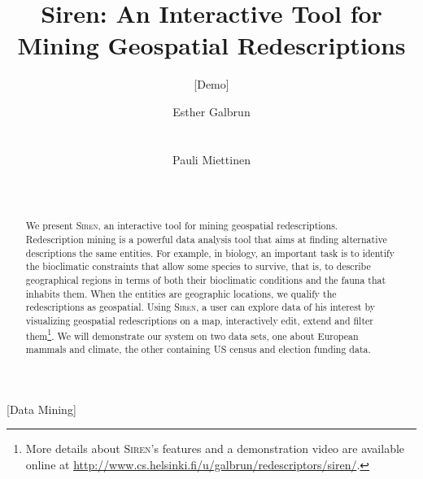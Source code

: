 \documentclass{sig-alternate}
\newcommand{\Siren}{\textsc{Siren}}
\begin{document}
\setlength{\pdfpageheight}{11in}%
\setlength{\pdfpagewidth}{8.5in}%


\title{Siren: An Interactive Tool for Mining Geospatial Redescriptions}
\subtitle{[Demo]}

\author{
\alignauthor
Esther Galbrun\\
       \\
       \\
\alignauthor
Pauli Miettinen\\
       \\
       \\
}

\maketitle
\begin{abstract}
  We present \Siren, an interactive tool for mining geospatial
  redescriptions.  Redescription mining is a powerful data analysis
  tool that aims at finding alternative descriptions the same
  entities.  For example, in biology, an important task is to identify
  the bioclimatic constraints that allow some species to survive, that
  is, to describe geographical regions in terms of both their
  bioclimatic conditions and the fauna that inhabits them.  When the
  entities are geographic locations, we qualify the redescriptions as
  geospatial.  Using \Siren, a user can explore data of his
  interest by visualizing geospatial redescriptions on a map,
  interactively edit, extend and filter them\footnote{More details about \Siren's features and a demonstration video are available online at \url{http://www.cs.helsinki.fi/u/galbrun/redescriptors/siren/}.}. 
  We will demonstrate our
  system on two data sets, one about European mammals and climate, the
  other containing US census and election funding data.
\end{abstract}

[Data Mining]

\end{document}
